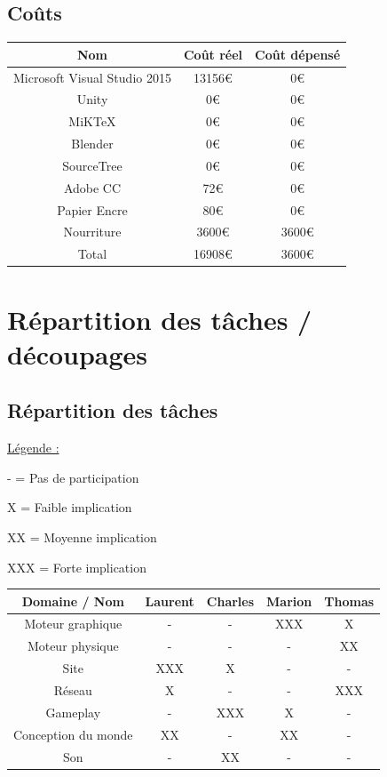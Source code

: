 \documentclass[a4paper]{article}
\begin{document}
	\subsection{Coûts}

\begin{tabular}{|c|c|c|}
\hline Nom & Coût réel & Coût dépensé \\
\hline Microsoft Visual Studio 2015 & 13156€ & 0€ \\
\hline Unity & 0€ & 0€ \\
\hline MiKTeX & 0€ & 0€ \\
\hline Blender & 0€ & 0€\\
\hline SourceTree & 0€ & 0€ \\
\hline Adobe CC & 72€ & 0€\\
\hline Papier Encre & 80€ & 0€\\
\hline Nourriture & 3600€ & 3600€\\
\hline Total & 16908€ & 3600€\\
\hline
\end{tabular} 

\newpage

\section{Répartition des tâches / découpages}
	\subsection{Répartition des tâches}
\underline{Légende :} 


\quad
- = Pas de participation

 \quad
X = Faible implication

\quad
XX = Moyenne implication

\quad
XXX = Forte implication

 \quad

\begin{tabular}{|c||c|c|c|c|}
\hline Domaine / Nom & Laurent & Charles & Marion & Thomas \\ 
\hline Moteur graphique & - & - & XXX & X\\
\hline Moteur physique & - & - & - & XX\\
\hline Site & XXX & X & - & -\\
\hline Réseau & X & - & - & XXX\\
\hline Gameplay & - & XXX & X & -\\
\hline Conception du monde & XX & - & XX & -\\
\hline Son & - & XX & - & -\\
\hline


\end{tabular}
\end{document}
